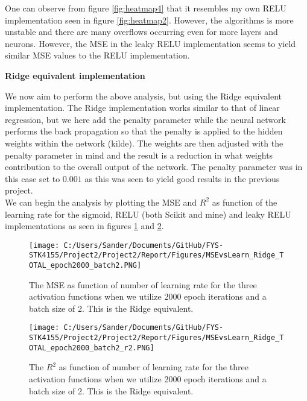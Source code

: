 \documentclass[12pt,a4paper]{article}
\begin{document}
\noindent One can observe from figure \ref{fig:heatmap4} that it resembles my own RELU implementation seen in figure \ref{fig:heatmap2}. However, the algorithms is more unstable and there are many overflows occurring even for more layers and neurons. However, the MSE in the leaky RELU implementation seems to yield similar MSE values to the RELU implementation.

\begin{center}
\large{\textbf{Ridge equivalent implementation}}
\end{center}

\noindent We now aim to perform the above analysis, but using the Ridge equivalent implementation. The Ridge implementation works similar to that of linear regression, but we here add the penalty parameter while the neural network performs the back propagation so that the penalty is applied to the hidden weights within the network (kilde). The weights are then adjusted with the penalty parameter in mind and the result is a reduction in what weights contribution to the overall output of the network. The penalty parameter was in this case set to $0.001$ as this was seen to yield good results in the previous project. 
\\
We can begin the analysis by plotting the MSE and $R^2$ as function of the learning rate for the sigmoid, RELU (both Scikit and mine) and leaky RELU implementations as seen in figures \ref{fig:MSEvsLrateTOTAL9} and \ref{fig:MSEvsLrateTOTAL10}.

\begin{figure}[H]
\centering
\texttt{[image: C:/Users/Sander/Documents/GitHub/FYS-STK4155/Project2/Project2/Report/Figures/MSEvsLearn\_Ridge\_TOTAL\_epoch2000\_batch2.PNG]}
\caption{\label{fig:MSEvsLrateTOTAL9} The MSE as function of number of learning rate for the three activation functions when we utilize 2000 epoch iterations and a batch size of 2. This is the Ridge equivalent.}
\end{figure}

\begin{figure}[H]
\centering
\texttt{[image: C:/Users/Sander/Documents/GitHub/FYS-STK4155/Project2/Project2/Report/Figures/MSEvsLearn\_Ridge\_TOTAL\_epoch2000\_batch2\_r2.PNG]}
\caption{\label{fig:MSEvsLrateTOTAL10} The $R^2$ as function of number of learning rate for the three activation functions when we utilize 2000 epoch iterations and a batch size of 2. This is the Ridge equivalent.}
\end{figure}
\end{document}
